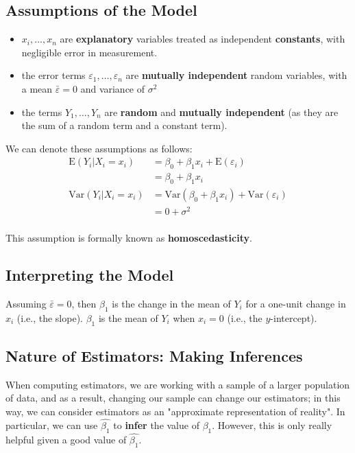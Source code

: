 \documentclass[12pt]{article}
\begin{document}
\subsection{Assumptions of the Model}
\begin{itemize}
    \item $x_i, \dots, x_n$ are \textbf{explanatory} variables treated as independent \textbf{constants}, with negligible error in measurement.
    \item the error terms $\varepsilon_1, \dots, \varepsilon_n$ are \textbf{mutually independent} random variables, with a mean $\bar{\varepsilon} = 0$ and variance of $\sigma^2$
    \item the terms $Y_1, \dots, Y_n$ are \textbf{random} and \textbf{mutually independent} (as they are the sum of a random term and a constant term).
\end{itemize}

We can denote these assumptions as follows: \begin{align*}
    \text{E}(Y_i|X_i = x_i) &= \beta_0 + \beta_1 x_i + \text{E}(\varepsilon_i)\\
    &= \beta_0 + \beta_1 x_i\\
    \text{Var}(Y_i|X_i = x_i) &= \text{Var}(\beta_0 + \beta_1 x_i) + \text{Var}(\varepsilon_i)\\
    &= 0 + \sigma^2\\
\end{align*}

This assumption is formally known as \textbf{homoscedasticity}.

\subsection{Interpreting the Model}

Assuming $\bar{\varepsilon} = 0$, then $\beta_1$ is the change in the mean of $Y_i$ for a one-unit change in $x_i$ (i.e., the slope). $\beta_1$ is the mean of $Y_i$ when $x_i = 0$ (i.e., the $y$-intercept).

\subsection{Nature of Estimators: Making Inferences}

When computing estimators, we are working with a sample of a larger population of data, and as a result, changing our sample can change our estimators; in this way, we can consider estimators as an "approximate representation of reality". In particular, we can use $\hat{\beta_1}$ to \textbf{infer} the value of $\beta_1$. However, this is only really helpful given a good value of $\hat{\beta_1}$.
\end{document}
